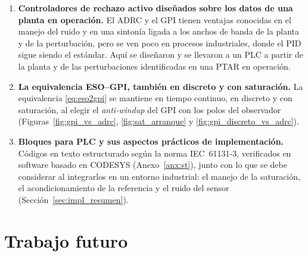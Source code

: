 \begin{enumerate}

  \item \textbf{Controladores de rechazo activo diseñados sobre los datos de una planta en operación.}
  El ADRC y el GPI tienen ventajas conocidas en el manejo del ruido y en una sintonía ligada a los anchos
  de banda de la planta y de la perturbación, pero se ven poco en procesos industriales, donde el PID
  sigue siendo el estándar. Aquí se diseñaron y se llevaron a un PLC a partir de la planta y de las
  perturbaciones identificadas en una PTAR en operación.

  \item \textbf{La equivalencia ESO--GPI, también en discreto y con saturación.} La equivalencia
  \eqref{eq:eso2gpi} se mantiene en tiempo continuo, en discreto y con saturación, al elegir el
  \emph{anti-windup} del GPI con los polos del observador (Figuras~\ref{fig:gpi_vs_adrc},
  \ref{fig:sat_arranque} y \ref{fig:gpi_discreto_vs_adrc}).

  \item \textbf{Bloques para PLC y sus aspectos prácticos de implementación.} Códigos en texto
  estructurado según la norma IEC~61131-3, verificados en software basado en CODESYS (Anexo~\ref{anx:st}), junto con lo que
  se debe considerar al integrarlos en un entorno industrial: el manejo de la saturación, el
  acondicionamiento de la referencia y el ruido del sensor (Sección~\ref{sec:impl_resumen}).

\end{enumerate}

\section{Trabajo futuro}

